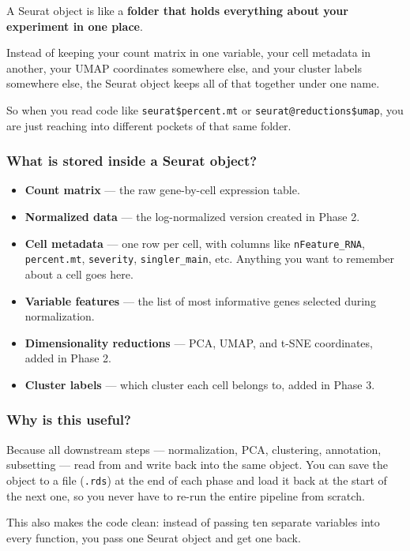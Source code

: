\documentclass[11pt, a4paper]{article}
\begin{document}
A Seurat object is like a \textbf{folder that holds everything about your experiment in one place}.

Instead of keeping your count matrix in one variable, your cell metadata in another,
your UMAP coordinates somewhere else, and your cluster labels somewhere else,
the Seurat object keeps all of that together under one name.

So when you read code like \texttt{seurat\$percent.mt} or
\texttt{seurat@reductions\$umap}, you are just reaching into different pockets
of that same folder.

\subsubsection{What is stored inside a Seurat object?}

\begin{itemize}[nosep]
  \item \textbf{Count matrix} — the raw gene-by-cell expression table.
  \item \textbf{Normalized data} — the log-normalized version created in Phase 2.
  \item \textbf{Cell metadata} — one row per cell, with columns like
        \texttt{nFeature\_RNA}, \texttt{percent.mt}, \texttt{severity}, \texttt{singler\_main}, etc.
        Anything you want to remember about a cell goes here.
  \item \textbf{Variable features} — the list of most informative genes selected during normalization.
  \item \textbf{Dimensionality reductions} — PCA, UMAP, and t-SNE coordinates, added in Phase 2.
  \item \textbf{Cluster labels} — which cluster each cell belongs to, added in Phase 3.
\end{itemize}

\subsubsection{Why is this useful?}

Because all downstream steps — normalization, PCA, clustering, annotation, subsetting —
read from and write back into the same object. You can save the object to a file
(\texttt{.rds}) at the end of each phase and load it back at the start of the next one,
so you never have to re-run the entire pipeline from scratch.

This also makes the code clean: instead of passing ten separate variables into every
function, you pass one Seurat object and get one back.
\end{document}
